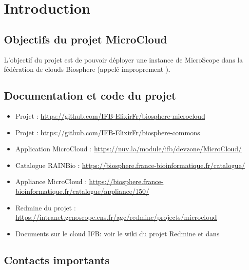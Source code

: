 \chapter{Introduction}

\section{Objectifs du projet MicroCloud}

L'objectif du projet est de pouvoir déployer une instance de MicroScope dans la fédération de clouds Biosphere (appelé improprement ).

\section{Documentation et code du projet}

\begin{itemize}
    \item Projet  : \url{https://github.com/IFB-ElixirFr/biosphere-microcloud}
    \item Projet  : \url{https://github.com/IFB-ElixirFr/biosphere-commons}
    \item Application MicroCloud : \url{https://nuv.la/module/ifb/devzone/MicroCloud/}
    \item Catalogue RAINBio : \url{https://biosphere.france-bioinformatique.fr/catalogue/}
    \item Appliance MicroCloud : \url{https://biosphere.france-bioinformatique.fr/catalogue/appliance/150/}
    \item Redmine du projet : \url{https://intranet.genoscope.cns.fr/agc/redmine/projects/microcloud}
    \item Documents sur le cloud IFB: voir le wiki du projet Redmine et dans 
\end{itemize}

\section{Contacts importants} \label{sec:contacts}

